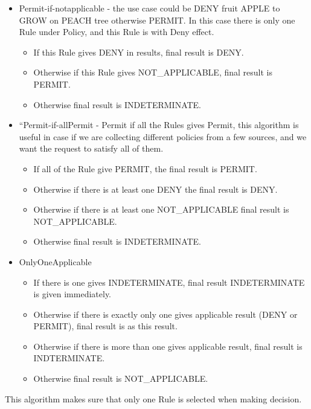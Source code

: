\documentclass[a4paper]{article}
\newcommand\liststyleWWviiiNumxxi{%
\renewcommand\labelitemi{[F0B7?]}
\renewcommand\labelitemii{o}
\renewcommand\labelitemiii{[F0A7?]}
\renewcommand\labelitemiv{[F0B7?]}
}
\begin{document}
\liststyleWWviiiNumxxi
\begin{itemize}
\item {\color{black}
Permit-if-notapplicable - the use case could be {\textquotedbl}DENY
fruit APPLE to GROW on PEACH tree otherwise PERMIT{\textquotedbl}. In
this case there is only one Rule under Policy, and this Rule is with
{\textquotedbl}Deny{\textquotedbl} effect. }

\begin{itemize}
\item {\color{black}
If this Rule gives DENY in results, final result is DENY.}
\item {\color{black}
Otherwise if this Rule gives NOT\_APPLICABLE, final result is PERMIT.}
\item {\color{black}
Otherwise final result is INDETERMINATE. }
\end{itemize}
\item {\color{black}
{\textquotedblleft}Permit-if-allPermit{\textquotedbl} - Permit if all
the Rules gives Permit, this algorithm is useful in case if we are
collecting different policies from a few sources, and we want the
request to satisfy all of them.}

\begin{itemize}
\item {\color{black}
If all of the Rule give PERMIT, the final result is PERMIT.}
\item {\color{black}
Otherwise if there is at least one DENY the final result is DENY.}
\item {\color{black}
Otherwise if there is at least one NOT\_APPLICABLE final result is
NOT\_APPLICABLE.}
\item {\color{black}
Otherwise final result is INDETERMINATE.}
\end{itemize}
\item {\color{black}
OnlyOneApplicable}

\begin{itemize}
\item {\color{black}
If there is one gives INDETERMINATE, final result INDETERMINATE is given
immediately.}
\item {\color{black}
Otherwise if there is exactly only one gives applicable result (DENY or
PERMIT), final result is as this result.}
\item {\color{black}
Otherwise if there is more than one gives applicable result, final
result is INDTERMINATE.}
\item {\color{black}
Otherwise final result is NOT\_APPLICABLE.}
\end{itemize}
\end{itemize}
{\color{black}
This algorithm makes sure that only one Rule is selected when making
decision.}
\end{document}
